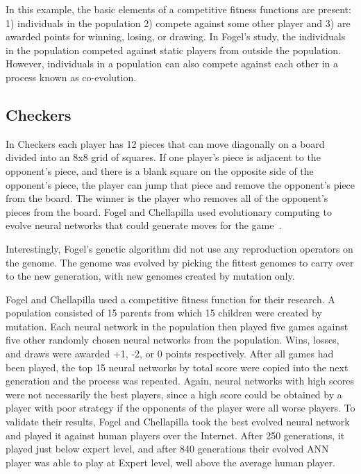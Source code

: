 In this example, the basic elements of a competitive fitness functions are
present: 1) individuals in the population 2) compete against some other player
and 3) are awarded points for winning, losing, or drawing. In Fogel's study, the
individuals in the population competed against static players from outside the
population. However, individuals in a population can also compete against each
other in a process known as co-evolution.

\subsection{Checkers}

In Checkers each player has 12 pieces that can move diagonally on a board
divided into an 8x8 grid of squares. If one player's piece is adjacent to the
opponent's piece, and there is a blank square on the opposite side of the
opponent's piece, the player can jump that piece and remove the opponent's piece
from the board. The winner is the player who removes all of the opponent's
pieces from the board. Fogel and Chellapilla used evolutionary computing  to
evolve neural networks that could generate moves for the
game~\cite{Fogel2000Anaconda,journals/tec/ChellapillaF01}.

Interestingly, Fogel's genetic algorithm did not use any reproduction operators
on the genome. The genome was evolved by picking the fittest genomes to carry
over to the new generation, with new genomes created by mutation only.

Fogel and Chellapilla used a competitive fitness function for their research.
A population consisted of 15 parents from which 15 children were created by
mutation. Each neural network in the population then played five games against
five other randomly chosen neural networks from the population. Wins, losses,
and draws were awarded +1, -2, or 0 points respectively. After all games had
been played, the top 15 neural networks by total score were copied into the next
generation and the process was repeated. Again, neural networks with high scores
were not necessarily the best players, since a high score could be obtained by a
player with poor strategy if the opponents of the player were all worse players.
To validate their results, Fogel and Chellapilla took the best evolved neural
network and played it against human players over the Internet. After 250
generations, it played just below expert level, and after 840 generations their
evolved ANN player was able to play at Expert level, well above the average
human player.

